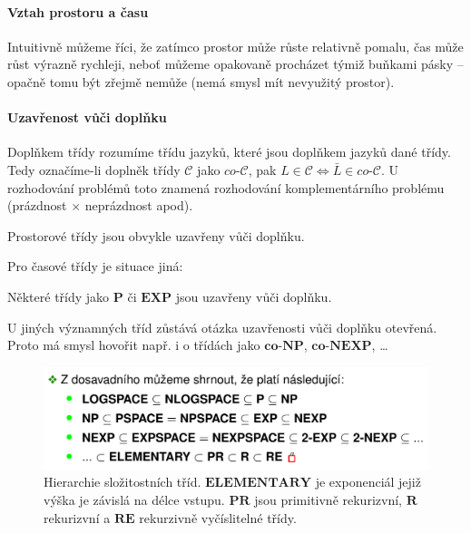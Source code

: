 \paragraph*{Vztah prostoru a času} Intuitivně můžeme říci, že zatímco prostor může růste relativně pomalu, čas může růst výrazně rychleji, neboť můžeme opakovaně procházet týmiž buňkami pásky -- opačně tomu být zřejmě nemůže (nemá smysl mít nevyužitý prostor).

\paragraph*{Uzavřenost vůči doplňku} Doplňkem třídy rozumíme třídu jazyků, které jsou doplňkem jazyků dané třídy. Tedy označíme-li doplněk třídy $\mathcal{C}$ jako $co\text{-}\mathcal{C}$, pak $L \in \mathcal{C} \Leftrightarrow \bar{L} \in co\text{-}\mathcal{C}$. U rozhodování problémů toto znamená rozhodování komplementárního problému (prázdnost $\times$ neprázdnost apod). \begin{compactitem}
    \item Prostorové třídy jsou obvykle uzavřeny vůči doplňku.
    \item Pro časové třídy je situace jiná: \begin{compactitem}
        \item Některé třídy jako $\mathbf{P}$ či $\mathbf{EXP}$ jsou uzavřeny vůči doplňku.
        \item U jiných významných tříd zůstává otázka uzavřenosti vůči doplňku otevřená. Proto má smysl hovořit např. i o třídách jako $\mathbf{co\text{-}NP}$, $\mathbf{co\text{-}NEXP}$, \dots
    \end{compactitem}
\end{compactitem}

\begin{figure}[H]
    \centering
    \includegraphics[width=0.9\linewidth]{complexity_class_hierarchy.pdf}
    \caption{Hierarchie složitostních tříd. $\mathbf{ELEMENTARY}$ je  exponenciál jejiž výška je závislá na délce vstupu. $\mathbf{PR}$ jsou primitivně rekurizvní, $\mathbf{R}$ rekurizvní a $\mathbf{RE}$ rekurzivně vyčíslitelné třídy.}
\end{figure}

